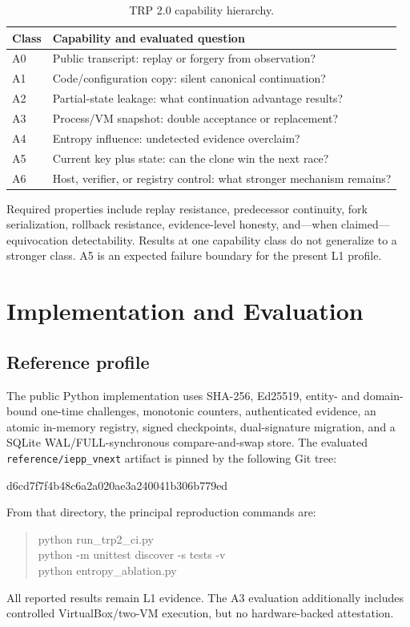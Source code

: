\documentclass[11pt]{article}
\begin{document}
\begin{table}[t]
\centering
\caption{TRP 2.0 capability hierarchy.}
\label{tab:capabilities}
\small
\begin{tabular}{p{}p{}}
\toprule
Class & Capability and evaluated question\\
\midrule
A0 & Public transcript: replay or forgery from observation?\\
A1 & Code/configuration copy: silent canonical continuation?\\
A2 & Partial-state leakage: what continuation advantage results?\\
A3 & Process/VM snapshot: double acceptance or replacement?\\
A4 & Entropy influence: undetected evidence overclaim?\\
A5 & Current key plus state: can the clone win the next race?\\
A6 & Host, verifier, or registry control: what stronger mechanism remains?\\
\bottomrule
\end{tabular}
\end{table}

Required properties include replay resistance, predecessor continuity, fork serialization, rollback resistance, evidence-level honesty, and---when claimed---equivocation detectability. Results at one capability class do not generalize to a stronger class. A5 is an expected failure boundary for the present L1 profile.

\section{Implementation and Evaluation}
\subsection{Reference profile}
The public Python implementation uses SHA-256, Ed25519, entity- and domain-bound one-time challenges, monotonic counters, authenticated evidence, an atomic in-memory registry, signed checkpoints, dual-signature migration, and a SQLite WAL/FULL-synchronous compare-and-swap store. The evaluated \texttt{reference/iepp\_vnext} artifact is pinned by the following Git tree:
\begin{center}\small\ttfamily d6cd7f7f4b48c6a2a020ae3a240041b306b779ed\end{center}
From that directory, the principal reproduction commands are:
\begin{quote}\small\ttfamily
python run\_trp2\_ci.py\\
python -m unittest discover -s tests -v\\
python entropy\_ablation.py
\end{quote}
All reported results remain L1 evidence. The A3 evaluation additionally includes controlled VirtualBox/two-VM execution, but no hardware-backed attestation.
\end{document}
